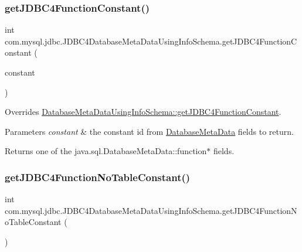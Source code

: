 \subsubsection{\texorpdfstring{get\+J\+D\+B\+C4\+Function\+Constant()}{getJDBC4FunctionConstant()}}
{\footnotesize\ttfamily int com.\+mysql.\+jdbc.\+J\+D\+B\+C4\+Database\+Meta\+Data\+Using\+Info\+Schema.\+get\+J\+D\+B\+C4\+Function\+Constant (\begin{DoxyParamCaption}\item[{\mbox{\hyperlink{enumcom_1_1mysql_1_1jdbc_1_1_database_meta_data_using_info_schema_1_1_j_d_b_c4_function_constant}{J\+D\+B\+C4\+Function\+Constant}}}]{constant }\end{DoxyParamCaption})\hspace{0.3cm}{\ttfamily [protected]}}

Overrides \mbox{\hyperlink{classcom_1_1mysql_1_1jdbc_1_1_database_meta_data_using_info_schema_a7c25e43c46f40752d923944f2d6f9bcc}{Database\+Meta\+Data\+Using\+Info\+Schema\+::get\+J\+D\+B\+C4\+Function\+Constant}}.


\begin{DoxyParams}{Parameters}
{\em constant} & the constant id from \mbox{\hyperlink{classcom_1_1mysql_1_1jdbc_1_1_database_meta_data}{Database\+Meta\+Data}} fields to return.\\
\hline
\end{DoxyParams}
\begin{DoxyReturn}{Returns}
one of the java.\+sql.\+Database\+Meta\+Data\+::function$\ast$ fields. 
\end{DoxyReturn}
\mbox{\label{classcom_1_1mysql_1_1jdbc_1_1_j_d_b_c4_database_meta_data_using_info_schema_afd840700d26d2c6ddeb00041cecfe90f}} 
\subsubsection{\texorpdfstring{get\+J\+D\+B\+C4\+Function\+No\+Table\+Constant()}{getJDBC4FunctionNoTableConstant()}}
{\footnotesize\ttfamily int com.\+mysql.\+jdbc.\+J\+D\+B\+C4\+Database\+Meta\+Data\+Using\+Info\+Schema.\+get\+J\+D\+B\+C4\+Function\+No\+Table\+Constant (\begin{DoxyParamCaption}{ }\end{DoxyParamCaption})\hspace{0.3cm}{\ttfamily [protected]}}

